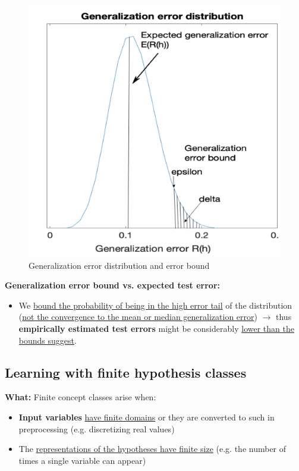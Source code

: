 \documentclass[12pt, a4paper]{article}
\begin{document}
\begin{figure}[H]
  \centering  %
    \includegraphics[width=0.6\columnwidth]{images/generalization-error-distribution.png}
    \caption{Generalization error distribution and error bound}
    \label{fig:fig3}
\end{figure}


\textbf{Generalization error bound vs. expected test error:}

\begin{itemize}
  \item We \uline{bound the probability of being in the high error tail} of the distribution (\uline{not the convergence to the mean or median generalization error}) $\rightarrow$ thus \textbf{empirically estimated test errors} might be considerably \uline{lower than the bounds suggest}.
\end{itemize}





\subsection{Learning with finite hypothesis classes
}\label{learning-with-finite-hypothesis-classes}

\textbf{What:} Finite concept classes arise when:

\begin{itemize}
  \item \textbf{Input variables} \uline{have finite domains} or they are converted to such in preprocessing (e.g. discretizing real values)
  \item The \uline{representations of the hypotheses have finite size} (e.g. the number of times a single variable can appear)
\end{itemize}
\end{document}
